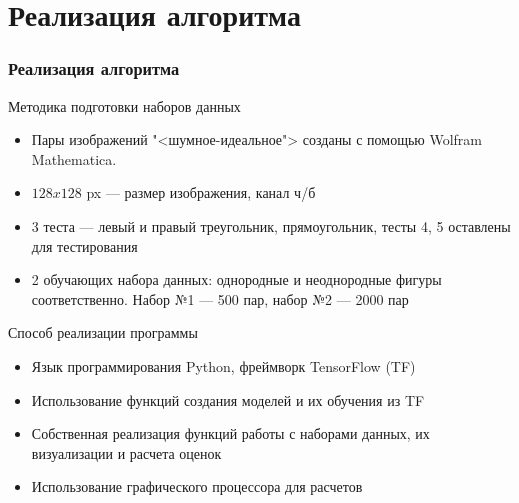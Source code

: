 \documentclass{beamer}
\begin{document}
\section{Реализация алгоритма}

\begin{frame}
	\frametitle{Реализация алгоритма}
	\vspace{-0.5em}
	\begin{block}{Методика подготовки наборов данных}
		\begin{itemize}
			\item Пары изображений "<шумное-идеальное"> созданы с помощью Wolfram Mathematica. 
			\item $128x128$ px --- размер изображения, канал ч/б
			\item $3$ теста --- левый и правый треугольник, прямоугольник, тесты 4, 5 оставлены для тестирования
			\item 2 обучающих набора данных: однородные и неоднородные фигуры соответственно. Набор №1 --- 500 пар,  набор №2 --- 2000 пар
		\end{itemize}
	\end{block}
	\begin{block}{Способ реализации программы}
		\begin{itemize}
			\item Язык программирования Python, фреймворк TensorFlow (TF)
			\item Использование функций создания моделей и их обучения из TF
			\item Собственная реализация функций работы с наборами данных, их визуализации и расчета оценок
		\item Использование графического процессора для расчетов 
		\end{itemize}
	\end{block}
\end{frame}
\end{document}
